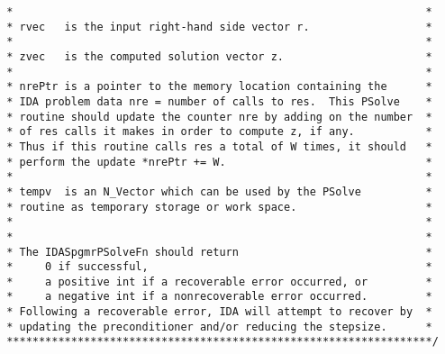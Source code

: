 \begin{verbatim}
 *                                                                *
 * rvec   is the input right-hand side vector r.                  *
 *                                                                *
 * zvec   is the computed solution vector z.                      *
 *                                                                *
 * nrePtr is a pointer to the memory location containing the      *
 * IDA problem data nre = number of calls to res.  This PSolve    *
 * routine should update the counter nre by adding on the number  *
 * of res calls it makes in order to compute z, if any.           *
 * Thus if this routine calls res a total of W times, it should   *
 * perform the update *nrePtr += W.                               *
 *                                                                *
 * tempv  is an N_Vector which can be used by the PSolve          *
 * routine as temporary storage or work space.                    *
 *                                                                *
 *                                                                *
 * The IDASpgmrPSolveFn should return                             *
 *     0 if successful,                                           *
 *     a positive int if a recoverable error occurred, or         *
 *     a negative int if a nonrecoverable error occurred.         *
 * Following a recoverable error, IDA will attempt to recover by  *
 * updating the preconditioner and/or reducing the stepsize.      *
 ******************************************************************/

\end{verbatim}
\normalsize

